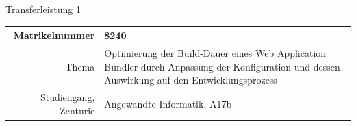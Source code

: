 \documentclass[11pt]{report}
\begin{document}
    {\vspace*{0.5cm}\huge Transferleistung 1}
    \vspace{1cm}

    \begin{center}
        \begin{tabularx}{\textwidth}{r|X}
            Matrikelnummer & 8240 \\\midrule
            Thema & Optimierung der Build-Dauer eines Web Application Bundler durch Anpassung der Konfiguration und dessen Auswirkung auf den Entwicklungsprozess \\\midrule
            Studiengang, Zenturie & Angewandte Informatik, A17b\
        \end{tabularx}
    \end{center}
    
    \pagebreak

    \tableofcontents
    \pagebreak

\end{document}

